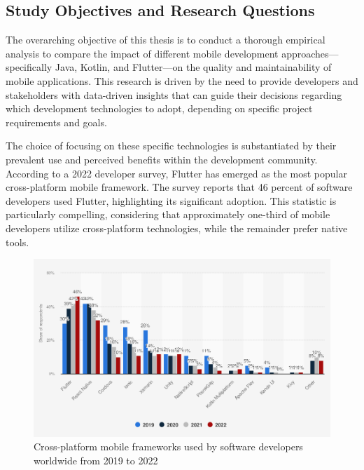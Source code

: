 \subsection{Study Objectives and Research Questions}
The overarching objective of this thesis is to conduct a thorough empirical analysis to compare the impact of different mobile development approaches—specifically Java, Kotlin, and Flutter—on the quality and maintainability of mobile applications. This research is driven by the need to provide developers and stakeholders with data-driven insights that can guide their decisions regarding which development technologies to adopt, depending on specific project requirements and goals. 
\par
The choice of focusing on these specific technologies is substantiated by their prevalent use and perceived benefits within the development community. According to a 2022 developer survey, Flutter has emerged as the most popular cross-platform mobile framework. The survey reports that 46 percent of software developers used Flutter, highlighting its significant adoption. This statistic is particularly compelling, considering that approximately one-third of mobile developers utilize cross-platform technologies, while the remainder prefer native tools.
\begin{figure}[htbp]
    \centering
    \includegraphics[scale = 0.45]{img/cross_platform-sts.png}
    \caption{Cross-platform mobile frameworks used by software developers worldwide from 2019 to 2022 \cite{jetbrains2022}}
    \label{fig:cross_platform-sts}
\end{figure}
